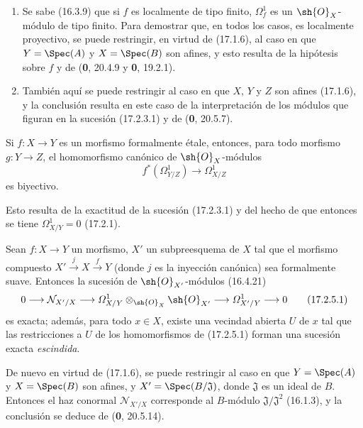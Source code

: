 \begin{enumerate}
  \item[(i)] Se sabe (16.3.9) que si $f$ es localmente de tipo finito, $\varOmega_f^1$ es un $\sh{O}_X$-módulo de tipo finito. Para demostrar que, en todos los casos, es localmente proyectivo, se puede restringir, en virtud de (17.1.6), al caso en que $Y=\Spec(A)$ y $X=\Spec(B)$ son afines, y esto resulta de la hipótesis sobre $f$ y de (\textbf 0, 20.4.9 y \textbf 0, 19.2.1).
  \item[(ii)] También aquí se puede restringir al caso en que $X$, $Y$ y $Z$ son afines (17.1.6), y la conclusión resulta en este caso de la interpretación de los módulos que figuran en la sucesión (17.2.3.1) y de (\textbf 0, 20.5.7).
\end{enumerate}

\begin{corollary}[17.2.4]
\label{IV.17.2.4}
Si $f:X\to Y$ es un morfismo formalmente étale, entonces, para todo morfismo $g:Y\to Z$, el homomorfismo canónico de $\sh{O}_X$-módulos
\[
  f^*(\varOmega_{Y/Z}^1)\longrightarrow\varOmega_{X/Z}^1
\]
es biyectivo.
\end{corollary}

Esto resulta de la exactitud de la sucesión (17.2.3.1) y del hecho de que entonces se tiene $\varOmega_{X/Y}^1=0$ (17.2.1).

\begin{proposition}[17.2.5]
\label{IV.17.2.5}
Sean $f:X\to Y$ un morfismo, $X'$ un subpreesquema de $X$ tal que el morfismo compuesto $X'\xrightarrow{j}X\xrightarrow{f}Y$ (donde $j$ es la inyección canónica) sea formalmente suave. Entonces la sucesión de $\sh{O}_{X'}$-módulos \textup{(16.4.21)}
\[
\label{IV.17.2.5.1}
  0\longrightarrow\mathcal{N}_{X'/X}\longrightarrow\varOmega_{X/Y}^1\otimes_{\sh{O}_X}\sh{O}_{X'}\longrightarrow\varOmega_{X'/Y}^1\longrightarrow0
  \tag{17.2.5.1}
\]
es exacta; además, para todo $x\in X$, existe una vecindad abierta $U$ de $x$ tal que las restricciones a $U$ de los homomorfismos de \textup{(17.2.5.1)} forman una sucesión exacta \emph{escindida}.
\end{proposition}

De nuevo en virtud de (17.1.6), se puede restringir al caso en que $Y=\Spec(A)$ y $X=\Spec(B)$ son afines, y $X'=\Spec(B/\mathfrak{J})$, donde $\mathfrak{J}$ es un ideal de $B$. Entonces el haz conormal $\mathcal{N}_{X'/X}$ corresponde al $B$-módulo $\mathfrak{J}/\mathfrak{J}^2$ (16.1.3), y la conclusión se deduce de (\textbf 0, 20.5.14).

